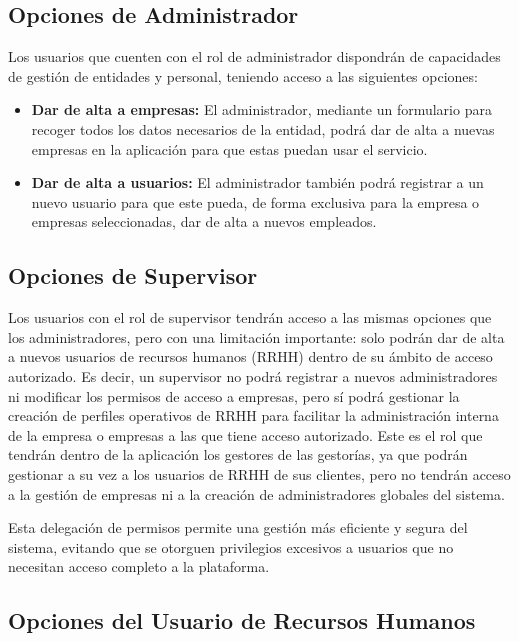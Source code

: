 \subsection{Opciones de Administrador}

Los usuarios que cuenten con el rol de administrador dispondrán de capacidades de gestión de entidades y personal, teniendo acceso a las siguientes opciones:
\begin{itemize}
    \item \textbf{Dar de alta a empresas:} El administrador, mediante un formulario para recoger todos los datos necesarios de la entidad, podrá dar de alta a nuevas empresas en la aplicación para que estas puedan usar el servicio.
    \item \textbf{Dar de alta a usuarios:} El administrador también podrá registrar a un nuevo usuario para que este pueda, de forma exclusiva para la empresa o empresas seleccionadas, dar de alta a nuevos empleados.
\end{itemize}

\subsection{Opciones de Supervisor}

Los usuarios con el rol de supervisor tendrán acceso a las mismas opciones que los administradores, pero con una limitación importante: solo podrán dar de alta a nuevos usuarios de recursos humanos (RRHH) dentro de su ámbito de acceso autorizado. Es decir, un supervisor no podrá registrar a nuevos administradores ni modificar los permisos de acceso a empresas, pero sí podrá gestionar la creación de perfiles operativos de RRHH para facilitar la administración interna de la empresa o empresas a las que tiene acceso autorizado. Este es el rol que tendrán dentro de la aplicación los gestores de las gestorías, ya que podrán gestionar a su vez a los usuarios de RRHH de sus clientes, pero no tendrán acceso a la gestión de empresas ni a la creación de administradores globales del sistema.

Esta delegación de permisos permite una gestión más eficiente y segura del sistema, evitando que se otorguen privilegios excesivos a usuarios que no necesitan acceso completo a la plataforma.


\subsection{Opciones del Usuario de Recursos Humanos}

